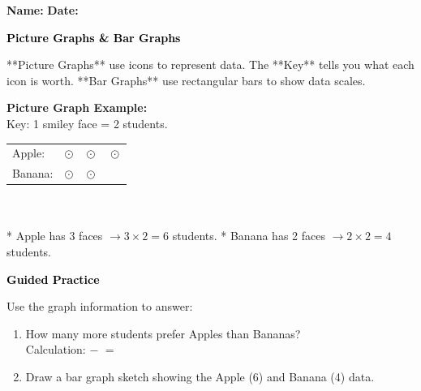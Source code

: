 \documentclass[12pt, letterpaper, fleqn]{article}
\newcommand{\blank}{\underline{\hspace{2.2cm}}}
\begin{document}
\textbf{Name:} \underline{\hspace{5cm}}
\hfill
\textbf{Date:} \underline{\hspace{3cm}}\\

\begin{tcolorbox}[colback=customteal!20]
    \large\textcolor{black}{\textbf{Picture Graphs \& Bar Graphs}}
\end{tcolorbox}

\vspace{3mm}
\noindent
**Picture Graphs** use icons to represent data. The **Key** tells you what each icon is worth.
**Bar Graphs** use rectangular bars to show data scales.

\begin{tcolorbox}[colback=white, colframe=black!25, boxrule=0.6pt, arc=4mm]
\textbf{Picture Graph Example:}
\\
Key: 1 smiley face = 2 students.
\\
\begin{tabular}{ll}
Apple: & $\odot \quad \odot \quad \odot$ \\
Banana: & $\odot \quad \odot$ \\
\end{tabular}
\\ \\
* Apple has 3 faces $\rightarrow 3 \times 2 = 6$ students.
* Banana has 2 faces $\rightarrow 2 \times 2 = 4$ students.
\end{tcolorbox}

\newpage
\begin{tcolorbox}[colback=customteal!20]
    \large\textcolor{black}{\textbf{Guided Practice}}
\end{tcolorbox}

\vspace{5mm}
\noindent
Use the graph information to answer:

\vspace{8mm}
\begin{enumerate}[itemsep=3cm, leftmargin=0.6cm]
\item How many more students prefer Apples than Bananas?
\\
Calculation: \blank $-$ \blank $=$ \blank

\item Draw a bar graph sketch showing the Apple (6) and Banana (4) data.
\vspace{4cm}
\end{enumerate}
\end{document}
